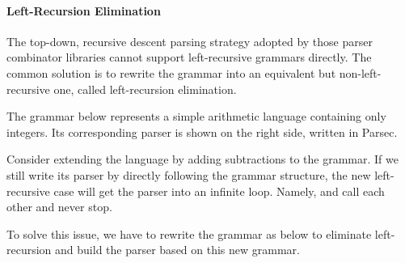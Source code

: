 \paragraph{Left-Recursion Elimination} The top-down, recursive descent parsing strategy adopted by those parser combinator libraries cannot support left-recursive grammars directly. The common solution is to rewrite the grammar into an equivalent but non-left-recursive one, called left-recursion elimination.

The grammar below represents a simple arithmetic language containing only integers. Its corresponding parser is shown on the right side, written in Parsec.



Consider extending the language by adding subtractions to the grammar. If we still write its parser by directly following the grammar structure, the new left-recursive case will get the parser into an infinite loop. Namely,  and  call each other and never stop.


To solve this issue, we have to rewrite the grammar as below to eliminate left-recursion and build the parser based on this new grammar.\\


